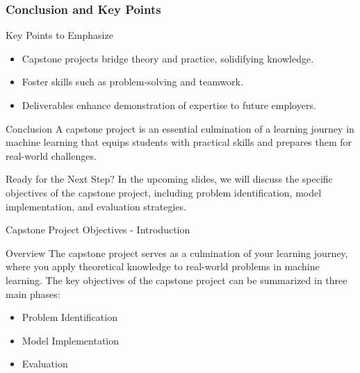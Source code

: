 \documentclass[aspectratio=169]{beamer}
\begin{document}
\begin{frame}[fragile]
    \frametitle{Conclusion and Key Points}
    \begin{block}{Key Points to Emphasize}
        \begin{itemize}
            \item Capstone projects bridge theory and practice, solidifying knowledge.
            \item Foster skills such as problem-solving and teamwork.
            \item Deliverables enhance demonstration of expertise to future employers.
        \end{itemize}
    \end{block}

    \begin{block}{Conclusion}
        A capstone project is an essential culmination of a learning journey in machine learning that equips students with practical skills and prepares them for real-world challenges.
    \end{block}

    \begin{block}{Ready for the Next Step?}
        In the upcoming slides, we will discuss the specific objectives of the capstone project, including problem identification, model implementation, and evaluation strategies.
    \end{block}
\end{frame}

\begin{frame}[fragile]{Capstone Project Objectives - Introduction}
    \begin{block}{Overview}
        The capstone project serves as a culmination of your learning journey, where you apply theoretical knowledge to real-world problems in machine learning. The key objectives of the capstone project can be summarized in three main phases: 
        \begin{itemize}
            \item Problem Identification
            \item Model Implementation
            \item Evaluation
        \end{itemize}
    \end{block}
\end{frame}
\end{document}
